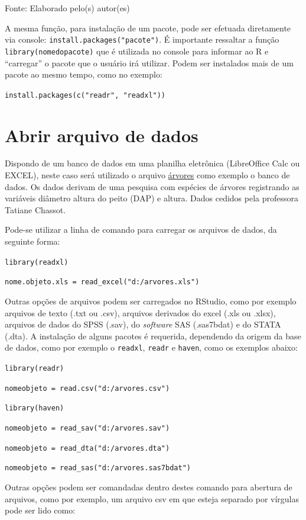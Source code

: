 \documentclass[12pt,brazil,oneside]{book}
\begin{document}
Fonte: Elaborado pelo(s) autor(es)

A mesma função, para instalação de um pacote, pode ser efetuada
diretamente via console: \texttt{install.packages("pacote")}. É
importante ressaltar a função \texttt{library(nomedopacote)} que é
utilizada no console para informar ao R e ``carregar'' o pacote que o
usuário irá utilizar. Podem ser instalados mais de um pacote ao mesmo
tempo, como no exemplo:

\texttt{install.packages(c("readr",\ "readxl"))}

\hypertarget{abrir-arquivo-de-dados}{%
\section{Abrir arquivo de dados}\label{abrir-arquivo-de-dados}}

Dispondo de um banco de dados em uma planilha eletrônica (LibreOffice
Calc ou EXCEL), neste caso será utilizado o arquivo
\href{https://github.com/Smolski/softwarelivrer/raw/master/basico/arvores.xlsx}{árvores}
como exemplo o banco de dados. Os dados derivam de uma pesquisa com
espécies de árvores registrando as variáveis diâmetro altura do peito
(DAP) e altura. Dados cedidos pela professora Tatiane Chassot.

Pode-se utilizar a linha de comando para carregar os arquivos de dados,
da seguinte forma:

\texttt{library(readxl)}

\texttt{nome.objeto.xls\ =\ read\_excel("d:/arvores.xls")}

Outras opções de arquivos podem ser carregados no RStudio, como por
exemplo arquivos de texto (.txt ou .csv), arquivos derivados do excel
(.xls ou .xlsx), arquivos de dados do SPSS (.sav), do \emph{software}
SAS (.sas7bdat) e do STATA (.dta). A instalação de alguns pacotes é
requerida, dependendo da origem da base de dados, como por exemplo o
\texttt{readxl}, \texttt{readr} e \texttt{haven}, como os exemplos
abaixo:

\texttt{library(readr)}

\texttt{nomeobjeto\ =\ read.csv("d:/arvores.csv")}

\texttt{library(haven)}

\texttt{nomeobjeto\ =\ read\_sav("d:/arvores.sav")}

\texttt{nomeobjeto\ =\ read\_dta("d:/arvores.dta")}

\texttt{nomeobjeto\ =\ read\_sas("d:/arvores.sas7bdat")}

Outras opções podem ser comandadas dentro destes comando para abertura
de arquivos, como por exemplo, um arquivo csv em que esteja separado por
vírgulas pode ser lido como:
\end{document}
